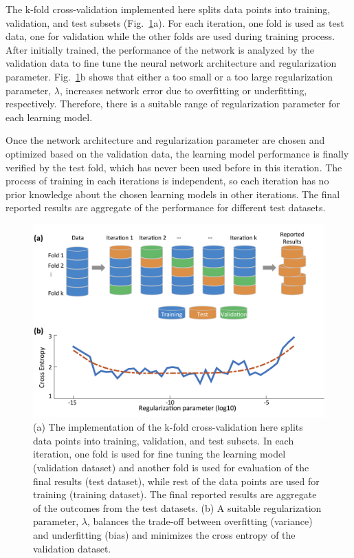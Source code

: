 \documentclass[aps,pra,reprint,longbibliography,groupedaddress]{revtex4-1}
\begin{document}
The k-fold cross-validation implemented here splits data points into training, validation, and test subsets (Fig.~\ref{fig:CrossValidationRegularization}a). For each iteration, one fold is used as test data, one for validation while the other folds are used during training process. After initially trained, the performance of the network is analyzed by the validation data to fine tune the neural network architecture and regularization parameter. Fig.~\ref{fig:CrossValidationRegularization}b shows that either a too small or a too large regularization parameter, $\lambda$, increases network error due to overfitting or underfitting, respectively. Therefore, there is a suitable range of regularization parameter for each learning model.

Once the network architecture and regularization parameter are chosen and optimized based on the validation data, the learning model performance is finally verified by the test fold, which has never been used before in this iteration. The process of training in each iterations is independent, so each iteration has no prior knowledge about the chosen learning models in other iterations. The final reported results are aggregate of the performance for different test datasets.

\begin{figure}
\includegraphics[scale=0.08]{FigureCrossValidationRegularization.jpg}
\caption{\label{fig:CrossValidationRegularization} 
(a) The implementation of the k-fold cross-validation here splits data points into training, validation, and test subsets. In each iteration, one fold is used for fine tuning the learning model (validation dataset) and another fold is used for evaluation of the final results (test dataset), while rest of the data points are used for training (training dataset). The final reported results are aggregate of the outcomes from the test datasets. (b) A suitable regularization parameter, $\lambda$, balances the trade-off between overfitting (variance) and underfitting (bias) and minimizes the cross entropy of the validation dataset.}
\end{figure}
\end{document}
